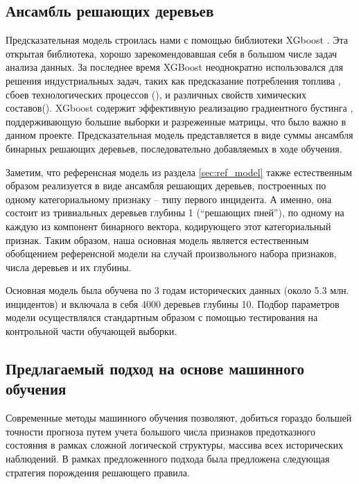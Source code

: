\subsection{Ансамбль решающих деревьев}\label{sec:xgboost}
Предсказательная модель строилась нами с помощью библиотеки XGboost \cite{chen2016xgboost}. Эта открытая библиотека, хорошо зарекомендовавшая себя в большом числе задач анализа данных\cite{chen2016xgboost}. За последнее время XGBoost неоднократно использовался для решения индустриальных задач, таких как предсказание потребления топлива \cite{horituchi2017predicting}, сбоев технологических процессов (\cite{bosch,DBLP:conf/bigdataconf/Hebert16}), и различных свойств химических составов(\cite{sheridan2016extreme,babajide2016bioactive}). XGboost содержит эффективную реализацию градиентного бустинга \cite{friedman2001greedy}, поддерживающую большие выборки и разреженные матрицы, что было важно в данном проекте. Предсказательная модель представляется в виде суммы ансамбля  бинарных решающих деревьев, последовательно добавляемых в ходе обучения.

Заметим, что референсная модель из раздела  \ref{sec:ref_model} также естественным образом реализуется в виде ансамбля решающих деревьев, построенных по одному категориальному признаку -- типу первого инцидента. А именно, она состоит из тривиальных деревьев глубины 1 (``решающих пней''), по одному на каждую из компонент бинарного вектора, кодирующего этот категориальный признак. Таким образом, наша основная модель является естественным обобщением референсной модели на случай произвольного набора признаков, числа деревьев и их глубины.

Основная модель была обучена по 3 годам исторических данных (около 5.3 млн. инцидентов) и включала в себя 4000 деревьев глубины 10. Подбор параметров модели осуществлялся стандартным образом с помощью тестирования на контрольной части обучающей выборки.

\subsection{Предлагаемый подход на основе машинного обучения}
Современные методы машинного обучения позволяют, добиться гораздо большей точности прогноза путем учета большого числа признаков предотказного состояния в рамках сложной логической структуры, массива всех исторических наблюдений. В рамках предложенного подхода была предложена следующая стратегия порождения решающего правила.

